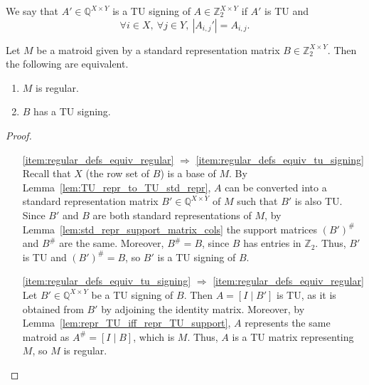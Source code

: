 \begin{definition}\label{def:tu_signing}
    We say that $A' \in \mathbb{Q}^{X \times Y}$ is a TU signing of $A \in \mathbb{Z}_{2}^{X \times Y}$ if $A'$ is TU and
    \[
        \forall i \in X, \ \forall j \in Y, \ |A_{i, j}'| = A_{i, j}.
    \]
\end{definition}

\begin{lemma}\label{lem:regular_defs_equiv}
    Let $M$ be a matroid given by a standard representation matrix $B \in \mathbb{Z}_{2}^{X \times Y}$. Then the following are equivalent.
    \begin{enumerate}
        \item\label{item:regular_defs_equiv_regular} $M$ is regular.
        \item\label{item:regular_defs_equiv_tu_signing} $B$ has a TU signing.
    \end{enumerate}
\end{lemma}

\begin{proof}
    ~
    \begin{itemize}
        \item[\ref{item:regular_defs_equiv_regular} $\Rightarrow$ \ref{item:regular_defs_equiv_tu_signing}] Recall that $X$ (the row set of $B$) is a base of $M$. By Lemma~\ref{lem:TU_repr_to_TU_std_repr}, $A$ can be converted into a standard representation matrix $B' \in \mathbb{Q}^{X \times Y}$ of $M$ such that $B'$ is also TU. Since $B'$ and $B$ are both standard representations of $M$, by Lemma~\ref{lem:std_repr_support_matrix_cols} the support matrices $(B')^{\#}$ and $B^{\#}$ are the same. Moreover, $B^{\#} = B$, since $B$ has entries in $\mathbb{Z}_{2}$. Thus, $B'$ is TU and $(B')^{\#} = B$, so $B'$ is a TU signing of $B$.

        \item[\ref{item:regular_defs_equiv_tu_signing} $\Rightarrow$ \ref{item:regular_defs_equiv_regular}] Let $B' \in \mathbb{Q}^{X \times Y}$ be a TU signing of $B$. Then $A = [I \mid B']$ is TU, as it is obtained from $B'$ by adjoining the identity matrix. Moreover, by Lemma~\ref{lem:repr_TU_iff_repr_TU_support}, $A$ represents the same matroid as $A^{\#} = [I \mid B]$, which is $M$. Thus, $A$ is a TU matrix representing $M$, so $M$ is regular.
    \end{itemize}
\end{proof}
